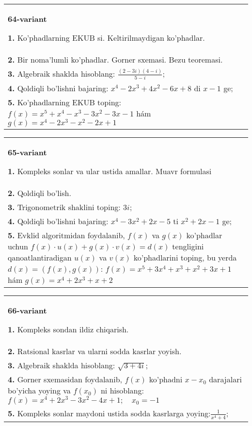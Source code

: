 \documentclass{article}
\begin{document}
\begin{tabular}{m{17cm}}
\textbf{64-variant}
\newline

\textbf{1.} Ko’phadlarning EKUB si. Keltirilmaydigan ko’phadlar. \\
\textbf{2.} Bir noma’lumli ko’phadlar. Gorner sxemasi. Bezu teoremasi.  \\
\textbf{3.} Algebraik shaklda hisoblang: $\frac{(2-3 i)(4-i)}{5-i}$; \\
\textbf{4.} Qoldiqli bo’lishni bajaring: $x^4-2 x^3+4 x^2-6 x+8$ di $x-1$ ge; \\
\textbf{5.} Ko’phadlarning EKUB toping: $f(x)=x^5+x^4-x^3-3 x^2-3 x-1$ hám $g(x)=x^4-2 x^3-x^2-2 x+1$ \\

\end{tabular}
\vspace{1cm}


\begin{tabular}{m{17cm}}
\textbf{65-variant}
\newline

\textbf{1.} Kompleks sonlar va ular ustida amallar. Muavr formulasi  \\
\textbf{2.} Qoldiqli bo’lish.  \\
\textbf{3.} Trigonometrik shaklini toping: $3 i$; \\
\textbf{4.} Qoldiqli bo’lishni bajaring: $x^4-3 x^2+2 x-5$ ti $x^2+2 x-1$ ge; \\
\textbf{5.} Evklid algoritmidan foydalanib, $f(x)$ va $g(x)$ ko’phadlar uchun $f(x) \cdot u(x)+g(x) \cdot v(x)=d(x)$ tengligini qanoatlantiradigan $u(x)$ va $v(x)$ ko’phadlarini toping, bu yerda $d(x)=(f(x), g(x))$:  $f(x)=x^5+3 x^4+x^3+x^2+3 x+1$ hám $g(x)=x^4+2 x^3+x+2$ \\

\end{tabular}
\vspace{1cm}


\begin{tabular}{m{17cm}}
\textbf{66-variant}
\newline

\textbf{1.} Kompleks sondan ildiz chiqarish. \\
\textbf{2.} Ratsional kasrlar va ularni sodda kasrlar yoyish. \\
\textbf{3.} Algebraik shaklda hisoblang:  $\sqrt{3+4 i}$; \\
\textbf{4.} Gorner sxemasidan foydalanib, $f(x)$ ko’phadni $x-x_0$ darajalari bo’yicha yoying va $f\left(x_0\right)$ ni hisoblang: $f(x)=x^4+2 x^3-3 x^2-4 x+1 ; \quad x_0=-1$ \\
\textbf{5.} Kompleks sonlar maydoni ustida sodda kasrlarga yoying:$\frac{1}{x^4+4}$; \\

\end{tabular}
\vspace{1cm}
\end{document}

